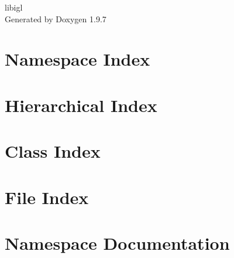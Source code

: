 \documentclass[twoside]{book}
\newcommand{\+}{\discretionary{\mbox{\scriptsize$\hookleftarrow$}}{}{}}
\newcommand{\clearemptydoublepage}{%
    \newpage{\pagestyle{empty}\cleardoublepage}%
  }
\begin{document}
  \raggedbottom
    \hypersetup{pageanchor=false,
                bookmarksnumbered=true,
                pdfencoding=unicode
               }
  \begin{titlepage}
  \vspace*{7cm}
  \begin{center}%
  {\Large libigl}\\
  \vspace*{1cm}
  {\large Generated by Doxygen 1.9.7}\\
  \end{center}
  \end{titlepage}
  \clearemptydoublepage
  \tableofcontents
  \clearemptydoublepage
  \hypersetup{pageanchor=true}


\chapter{Namespace Index}

\chapter{Hierarchical Index}

\chapter{Class Index}

\chapter{File Index}

\chapter{Namespace Documentation}


























\end{document}

